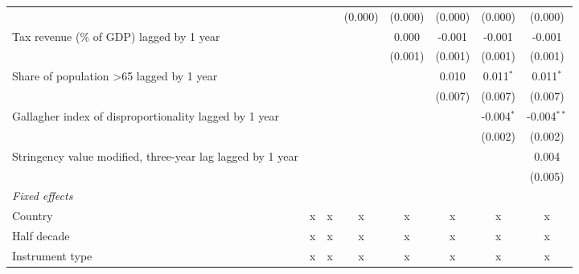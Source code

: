 \begin{tabular}{lccccccc}
                                                                                        &         &         & (0.000)      & (0.000)       & (0.000)     & (0.000)      & (0.000)\\   
   Tax revenue (\% of GDP) lagged by 1 year                                             &         &         &              & 0.000         & -0.001      & -0.001       & -0.001\\   
                                                                                        &         &         &              & (0.001)       & (0.001)     & (0.001)      & (0.001)\\   
   Share of population >65 lagged by 1 year                                             &         &         &              &               & 0.010       & 0.011$^{*}$  & 0.011$^{*}$\\   
                                                                                        &         &         &              &               & (0.007)     & (0.007)      & (0.007)\\   
   Gallagher index of disproportionality lagged by 1 year                               &         &         &              &               &             & -0.004$^{*}$ & -0.004$^{**}$\\   
                                                                                        &         &         &              &               &             & (0.002)      & (0.002)\\   
   Stringency value modified, three-year lag lagged by 1 year                           &         &         &              &               &             &              & 0.004\\   
                                                                                        &         &         &              &               &             &              & (0.005)\\   
   \emph{Fixed effects}\\
   Country                                                                              & x       & x       & x            & x             & x           & x            & x\\  
   Half decade                                                                          & x       & x       & x            & x             & x           & x            & x\\  
   Instrument type                                                                      & x       & x       & x            & x             & x           & x            & x\\  

\end{tabular}
